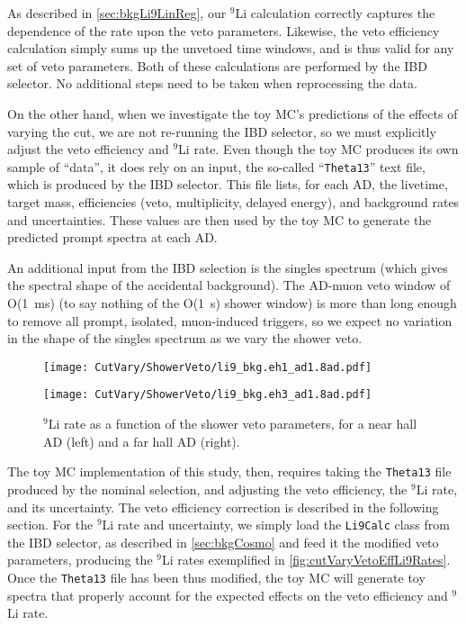 \documentclass[../thesis.tex]{subfiles}
\begin{document}
As described in \autoref{sec:bkgLi9LinReg}, our $^9$Li calculation correctly captures the dependence of the rate upon the veto parameters. Likewise, the veto efficiency calculation simply sums up the unvetoed time windows, and is thus valid for any set of veto parameters. Both of these calculations are performed by the IBD selector. No additional steps need to be taken when reprocessing the data.

On the other hand, when we investigate the toy MC's predictions of the effects of varying the cut, we are not re-running the IBD selector, so we must explicitly adjust the veto efficiency and $^9$Li rate. Even though the toy MC produces its own sample of ``data'', it does rely on an input, the so-called ``\texttt{Theta13}'' text file, which is produced by the IBD selector. This file lists, for each AD, the livetime, target mass, efficiencies (veto, multiplicity, delayed energy), and background rates and uncertainties. These values are then used by the toy MC to generate the predicted prompt spectra at each AD\@.

An additional input from the IBD selection is the singles spectrum (which gives the spectral shape of the accidental background). The AD-muon veto window of O(1~ms) (to say nothing of the O(1~s) shower window) is more than long enough to remove all prompt, isolated, muon-induced triggers, so we expect no variation in the shape of the singles spectrum as we vary the shower veto.

\begin{figure}[ht]
  \begin{minipage}{0.5\linewidth}%
    \texttt{[image: CutVary/ShowerVeto/li9\_bkg.eh1\_ad1.8ad.pdf]}%
  \end{minipage}%
  \begin{minipage}{0.5\linewidth}%
    \texttt{[image: CutVary/ShowerVeto/li9\_bkg.eh3\_ad1.8ad.pdf]}%
  \end{minipage}%
  \caption{$^9$Li rate as a function of the shower veto parameters, for a near hall AD (left) and a far hall AD (right).}
  \label{fig:cutVaryVetoEffLi9Rates}
\end{figure}

The toy MC implementation of this study, then, requires taking the \texttt{Theta13} file produced by the nominal selection, and adjusting the veto efficiency, the $^9$Li rate, and its uncertainty. The veto efficiency correction is described in the following section. For the $^9$Li rate and uncertainty, we simply load the \texttt{Li9Calc} class from the IBD selector, as described in \autoref{sec:bkgCosmo} and feed it the modified veto parameters, producing the $^9$Li rates exemplified in \autoref{fig:cutVaryVetoEffLi9Rates}. Once the \texttt{Theta13} file has been thus modified, the toy MC will generate toy spectra that properly account for the expected effects on the veto efficiency and $^9$Li rate.
\end{document}
